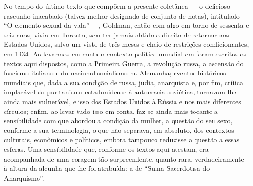 No tempo do último texto que compõem a presente coletânea --- o delicioso
rascunho inacabado (talvez melhor designado de conjunto de notas),
intitulado ``O elemento sexual da vida'' ---, Goldman, então com algo em
torno de sessenta e seis anos, vivia em Toronto, sem ter jamais obtido o
direito de retornar aos Estados Unidos, salvo um visto de três meses e
cheio de restrições condicionantes, em 1934. Ao levarmos em conta o
contexto político mundial em foram escritos os textos aqui dispostos,
como a Primeira Guerra, a revolução russa, a ascensão do fascismo
italiano e do nacional-socialismo na Alemanha; eventos históricos
mundiais que, dada a sua condição de russa, judia, anarquista e, por
fim, crítica implacável do puritanismo estadunidense à autocracia
soviética, tornavam-lhe ainda mais vulnerável, e isso dos Estados Unidos
à Rússia e nos mais diferentes círculos; enfim, ao levar tudo isso em
conta, faz-se ainda mais tocante a sensibilidade com que abordou a
condição da mulher, a questão do seu sexo, conforme a sua terminologia,
o que não separava, em absoluto, dos contextos culturais, econômicos e
políticos, embora tampouco reduzisse a questão a essas esferas. Uma
sensibilidade que, conforme os textos aqui atestam, era acompanhada de
uma coragem tão surpreendente, quanto rara, verdadeiramente à altura da
alcunha que lhe foi atribuída: a de ``Suma Sacerdotisa do Anarquismo''.

